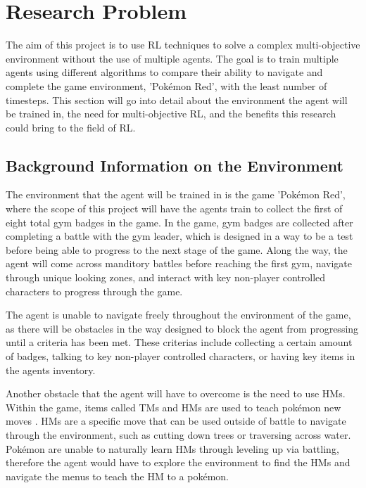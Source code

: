 \section{Research Problem}

The aim of this project is to use RL techniques to solve a complex multi-objective environment without the use of multiple agents. The goal is to train multiple agents using different algorithms to compare their ability to navigate and complete the game environment, 'Pokémon Red', with the least number of timesteps. This section will go into detail about the environment the agent will be trained in, the need for multi-objective RL, and the benefits this research could bring to the field of RL.

\subsection{Background Information on the Environment}

The environment that the agent will be trained in is the game 'Pokémon Red', where the scope of this project will have the agents train to collect the first of eight total gym badges in the game. In the game, gym badges are collected after completing a battle with the gym leader, which is designed in a way to be a test before being able to progress to the next stage of the game. Along the way, the agent will come across manditory battles before reaching the first gym, navigate through unique looking zones, and interact with key non-player controlled characters to progress through the game. 

The agent is unable to navigate freely throughout the environment of the game, as there will be obstacles in the way designed to block the agent from progressing until a criteria has been met. These criterias include collecting a certain amount of badges, talking to key non-player controlled characters, or having key items in the agents inventory.  

Another obstacle that the agent will have to overcome is the need to use HMs. Within the game, items called TMs and HMs are used to teach pokémon new moves \cite{SerebiiTeam2016}. HMs are a specific move that can be used outside of battle to navigate through the environment, such as cutting down trees or traversing across water. Pokémon are unable to naturally learn HMs through leveling up via battling, therefore the agent would have to explore the environment to find the HMs and navigate the menus to teach the HM to a pokémon.

